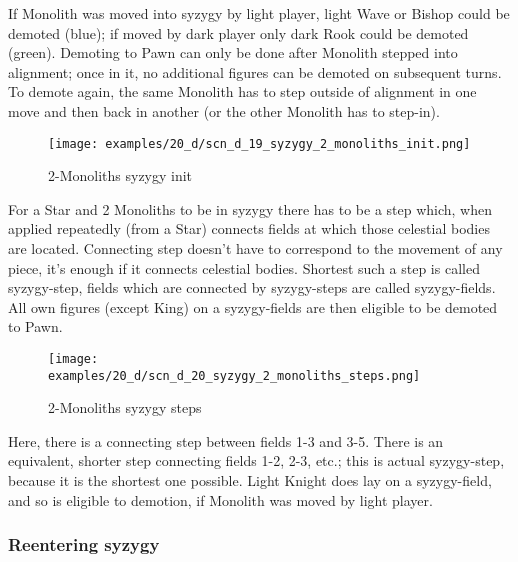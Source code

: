 If Monolith was moved into syzygy by light player, light Wave or Bishop could be demoted (blue); if moved by
dark player only dark Rook could be demoted (green). Demoting to Pawn can only be done after Monolith stepped
into alignment; once in it, no additional figures can be demoted on subsequent turns. To demote again, the same
Monolith has to step outside of alignment in one move and then back in another (or the other Monolith has to
step-in).

\clearpage %

\noindent
\begin{figure}[!h]
\texttt{[image: examples/20\_d/scn\_d\_19\_syzygy\_2\_monoliths\_init.png]}
\caption{2-Monoliths syzygy init}
\label{fig:scn_d_19_syzygy_2_monoliths_init}
\end{figure}

For a Star and 2 Monoliths to be in syzygy there has to be a step which, when applied repeatedly (from a Star)
connects fields at which those celestial bodies are located. Connecting step doesn't have to correspond to the
movement of any piece, it's enough if it connects celestial bodies. Shortest such a step is called syzygy-step,
fields which are connected by syzygy-steps are called syzygy-fields. All own figures (except King) on a
syzygy-fields are then eligible to be demoted to Pawn.

\clearpage %

\noindent
\begin{figure}[!h]
\texttt{[image: examples/20\_d/scn\_d\_20\_syzygy\_2\_monoliths\_steps.png]}
\caption{2-Monoliths syzygy steps}
\label{fig:scn_d_20_syzygy_2_monoliths_steps}
\end{figure}

Here, there is a connecting step between fields 1-3 and 3-5. There is an equivalent, shorter step connecting fields
1-2, 2-3, etc.; this is actual syzygy-step, because it is the shortest one possible. Light Knight does lay on a
syzygy-field, and so is eligible to demotion, if Monolith was moved by light player.

\clearpage %

\subsubsection*{Reentering syzygy}

